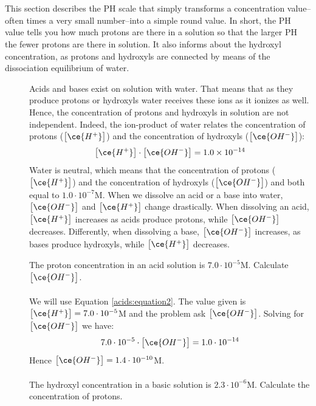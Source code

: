 \documentclass[main.tex]{subfiles}
\newcommand\chapterlabel{acids}
\begin{document}
\section{\color{blue!30!black}{The PH scale}}
This section describes the PH scale that simply transforms a concentration value--often times a very small number--into a simple round value. In short, the PH value tells you how much protons are there in a solution so that the larger PH the fewer protons are there in solution. It also informs about the hydroxyl concentration, as protons and hydroxyls are connected by means of the dissociation equilibrium of water.
\sloppy
\begin{description}
\item[] Acids and bases exist on solution with water. That means that as they produce protons or hydroxyls water receives these ions as it ionizes as well. Hence, the concentration of protons and hydroxyls in solution are not independent. Indeed, the ion-product of water relates the concentration of protons ($\big[ \ce{H^+}\big]$) and the concentration of hydroxyls ($\big[ \ce{OH^-}\big]$):
 \begin{equation*}
 \big[ \ce{H^+} \big] \cdot \big[ \ce{OH^-} \big]=1.0\times 10^{-14}
 \end{equation*}
Water is neutral, which means that the concentration of protons ($\big[ \ce{H^+}\big]$) and the concentration of hydroxyls ($\big[ \ce{OH^-}\big]$) and both equal to $1.0\cdot 10^{-7}$M. When we dissolve an acid or a base into water, $\big[ \ce{OH^-}\big]$ and $\big[ \ce{H^+}\big]$ change drastically. When dissolving an acid, $\big[ \ce{H^+}\big]$ increases as acids produce protons, while $\big[ \ce{OH^-}\big]$ decreases. Differently, when dissolving a base,  $\big[ \ce{OH^-}\big]$ increases, as bases produce hydroxyls, while $\big[ \ce{H^+}\big]$ decreases.
 
 
\begin{example} %
The proton concentration in an acid solution is $7.0\cdot 10^{-5}$M. Calculate $\big[ \ce{OH^-}\big]$.
\\
\\
We will use Equation \ref{\chapterlabel:equation2}. The value given is $\big[ \ce{H^+}\big]=7.0\cdot 10^{-5}$M and the problem ask $\big[ \ce{OH^-}\big]$. Solving for $\big[ \ce{OH^-}\big]$ we have:
\begin{equation*}
 7.0\cdot 10^{-5} \cdot \big[ \ce{OH^-} \big]=1.0\cdot 10^{-14}
 \end{equation*}
 Hence $\big[ \ce{OH^-}\big] =1.4\cdot 10^{-10}$M.
\\
\faDiamond\ \\
The hydroxyl concentration in a basic solution is $2.3\cdot 10^{-6}$M. Calculate the concentration of protons.
\end{example}%


\end{description}
\end{document}
